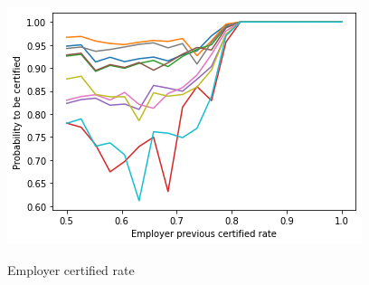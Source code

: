 \documentclass{article}
\begin{document}
\begin{figure}[H]
\begin{minipage}{.31\textwidth}
        \label{fig:prevailing_wage}
    \end{minipage}
    \begin{minipage}{.31\textwidth}
        \centering
        \caption{Employer certified rate}
        \includegraphics[width = \textwidth]{figures/Employer_certified_rate.png}
        \label{fig:employer}
    \end{minipage}
    

\end{figure}
\end{document}
